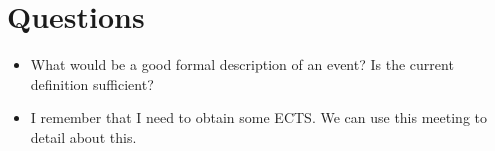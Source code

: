 \documentclass[10pt,final,a4paper,oneside,onecolumn]{article}
\begin{document}
\section*{Questions}
\begin{itemize}
	\item What would be a good formal description of an event? Is the current definition sufficient?
	\item I remember that I need to obtain some ECTS. We can use this meeting to detail about this.
\end{itemize}



\end{document}
